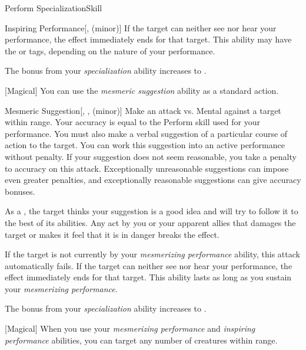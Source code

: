 \begin{feat}{Perform Specialization}{Skill}
\begin{apability}{Inspiring Performance}[,  (minor)]
            If the target can neither see nor hear your performance, the effect immediately ends for that target.
            This ability may have the  or  tags, depending on the nature of your performance.
        \end{apability}

         The bonus from your \textit{specialization} ability increases to .

        [Magical] You can use the \textit{mesmeric suggestion} ability as a standard action.
        \begin{apability}{Mesmeric Suggestion}[, ,  (minor)]
            Make an attack vs. Mental against a target within \rngmed range.
            Your accuracy is equal to the Perform skill used for your performance.
            You must also make a verbal suggestion of a particular course of action to the target.
            You can work this suggestion into an active performance without penalty.
            If your suggestion does not seem reasonable, you take a  penalty to accuracy on this attack.
            Exceptionally unreasonable suggestions can impose even greater penalties, and exceptionally reasonable suggestions can give accuracy bonuses.

            \hit As a , the target thinks your suggestion is a good idea and will try to follow it to the best of its abilities.
            Any act by you or your apparent allies that damages the target or makes it feel that it is in danger breaks the effect.

            If the target is not currently \fascinated by your \textit{mesmerizing performance} ability, this attack automatically fails.
            If the target can neither see nor hear your performance, the effect immediately ends for that target.
            This ability lasts as long as you sustain your \textit{mesmerizing performance}.
        \end{apability}

         The bonus from your \textit{specialization} ability increases to .


        [Magical] When you use your \textit{mesmerizing performance} and \textit{inspiring performance} abilities, you can target any number of creatures within range.
    \end{feat}

